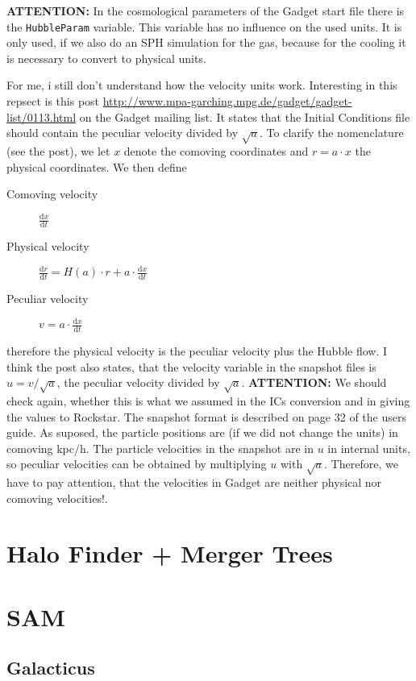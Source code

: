 \documentclass[a4paper,english,10.5pt]{scrartcl}
\begin{document}
\textbf{ATTENTION:} In the cosmological parameters of the Gadget start file there is the \texttt{HubbleParam} variable. This variable has no influence on the used units. It is only used, if we also do an SPH simulation for the gas, because for the cooling it is necessary to convert to physical units.

For me, i still don't understand how the velocity units work. Interesting in this repsect is this post \url{http://www.mpa-garching.mpg.de/gadget/gadget-list/0113.html} on the Gadget mailing list. It states that the Initial Conditions file should contain the peculiar velocity divided by $\sqrt{a}$. To clarify the nomenclature (see the post), we let $x$ denote the comoving coordinates and $r=a\cdot x$ the physical coordinates. We then define
\begin{description}
 \item[Comoving velocity] $\frac{\textrm{d}x}{\textrm{d}t}$
  \item[Physical velocity] $\frac{\textrm{d}r}{\textrm{d}t} = H(a)\cdot r+a\cdot \frac{\textrm{d}x}{\textrm{d}t}$
  \item[Peculiar velocity] $v = a\cdot \frac{\textrm{d}x}{\textrm{d}t}$ 
\end{description}
therefore the physical velocity is the peculiar velocity plus the Hubble flow. I think the post also states, that the velocity variable in the snapshot files is $u=v/\sqrt{a}$, the peculiar velocity divided by $\sqrt{a}$.
\textbf{ATTENTION:} We should check again, whether this is what we assumed in the ICs conversion and in giving the values to Rockstar.
The snapshot format is described on page 32 of the users guide. As suposed, the particle positions are (if we did not change the units) in comoving kpc/h. The particle velocities in the snapshot are in $u$ in internal units, so peculiar velocities can be obtained by multiplying $u$ with $\sqrt{a}$. Therefore, we have to pay attention, that the velocities in Gadget are neither physical nor comoving velocities!.


\section{Halo Finder + Merger Trees}

\section{SAM}
\subsection{Galacticus}
\end{document}
